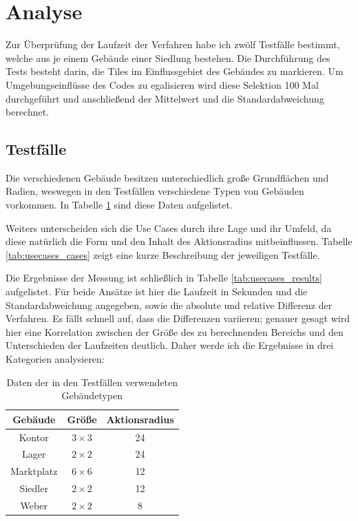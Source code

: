 \documentclass[%
			paper=a4,%
			DIV12,
			liststotoc,
			bibtotoc,
			draft=false,%
			titlepage,
			numbers=noendperiod
			]{scrartcl}
\begin{document}
\section{Analyse}


Zur Überprüfung der Laufzeit der Verfahren habe ich zwölf Testfälle bestimmt, welche aus je einem Gebäude einer Siedlung bestehen.
Die Durchführung des Tests besteht darin, die Tiles im Einflussgebiet des Gebäudes zu markieren.
Um Umgebungseinflüsse des Codes zu egalisieren wird diese Selektion 100 Mal durchgeführt und anschließend der Mittelwert und die Standardabweichung berechnet.

\subsection{Testfälle}

Die verschiedenen Gebäude besitzen unterschiedlich große Grundflächen und Radien, weswegen
in den Testfällen verschiedene Typen von Gebäuden vorkommen. In Tabelle \ref{tab:buildings} sind diese Daten aufgelistet.

Weiters unterscheiden sich die Use Cases durch ihre Lage und ihr Umfeld, da diese natürlich die Form und den Inhalt des Aktionsradius mitbeinflussen. Tabelle \ref{tab:usecases_cases} zeigt eine kurze Beschreibung der jeweiligen Testfälle.

Die Ergebnisse der Messung ist schließlich in Tabelle \ref{tab:usecases_results} aufgelistet. Für beide Ansätze ist hier die Laufzeit in Sekunden und die Standardabweichung angegeben, sowie die absolute und relative Differenz der Verfahren.
Es fällt schnell auf, dass die Differenzen variieren;
genauer gesagt wird hier eine Korrelation zwischen der Größe des zu berechnenden Bereichs und den Unterschieden der Laufzeiten deutlich. Daher werde ich die Ergebnisse in drei Kategorien analysieren:

\begin{table}[htpb]
	\begin{center}
		\begin{tabular}{|c|c|c|}
			\hline
			Gebäude & Größe & Aktionsradius \\
			\hline
			Kontor & $3\times3$ & 24 \\
			Lager & $2\times2$ & 24 \\
			Marktplatz & $6\times6$ & 12 \\
			Siedler & $2\times2$ & 12 \\
			Weber & $2\times2$ & 8 \\
			\hline
		\end{tabular}
		\caption{Daten der in den Testfällen verwendeten Gebäudetypen}
		\label{tab:buildings}
	\end{center}
\end{table}
\end{document}
